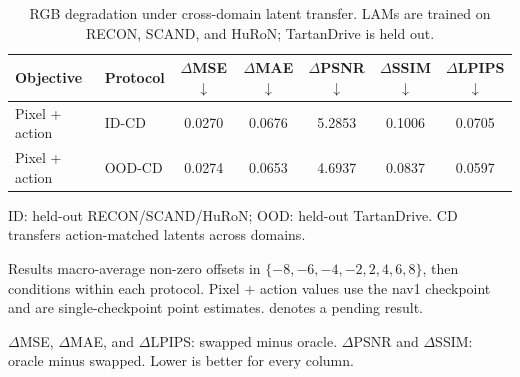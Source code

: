 \begin{table}[t]
  \centering
  \caption{RGB degradation under cross-domain latent transfer. LAMs are trained on RECON, SCAND, and HuRoN; TartanDrive is held out.}
  \label{tab:lam_cross_domain_rgb_degradation}
  \small
  \setlength{\tabcolsep}{5pt}
  \renewcommand{\arraystretch}{1.08}
  \begin{threeparttable}
    \begin{tabular}{llccccc}
      \toprule
      Objective & Protocol & $\Delta$MSE $\downarrow$ & $\Delta$MAE $\downarrow$ & $\Delta$PSNR $\downarrow$ & $\Delta$SSIM $\downarrow$ & $\Delta$LPIPS $\downarrow$ \\
      \midrule
      Pixel + action & ID-CD & 0.0270 & 0.0676 & 5.2853 & 0.1006 & 0.0705 \\
      Pixel + action & OOD-CD & 0.0274 & 0.0653 & 4.6937 & 0.0837 & 0.0597 \\
      \bottomrule
    \end{tabular}
    \begin{tablenotes}[flushleft]\footnotesize
      \item ID: held-out RECON/SCAND/HuRoN; OOD: held-out TartanDrive. CD transfers action-matched latents across domains.
      \item Results macro-average non-zero offsets in $\{-8,-6,-4,-2,2,4,6,8\}$, then conditions within each protocol. Pixel + action values use the nav1 checkpoint and are single-checkpoint point estimates. \CompACTMissing{} denotes a pending result.
      \item $\Delta$MSE, $\Delta$MAE, and $\Delta$LPIPS: swapped minus oracle. $\Delta$PSNR and $\Delta$SSIM: oracle minus swapped. Lower is better for every column.
    \end{tablenotes}
  \end{threeparttable}
\end{table}
